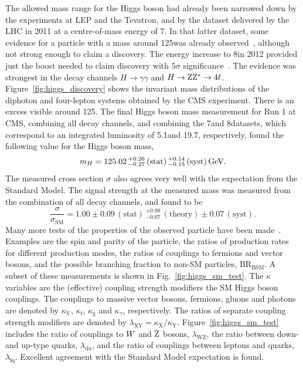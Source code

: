 The allowed mass range for the Higgs boson had already been narrowed down by the experiments at LEP
and the Tevatron, and by the dataset delivered by the LHC in 2011 at a centre-of-mass energy of
7\TeV. 
In that latter dataset, some evidence for a particle with a mass around 125\GeV was already
observed~\cite{Chatrchyan:2012tx}, although not strong enough to claim a discovery. 
The energy increase to 8\TeV in 2012 provided just the boost needed to claim
discovery with $5\sigma$ significance~\cite{Chatrchyan:2012ufa}. The evidence was strongest in the
decay channels $H\rightarrow\gamma\gamma$ and $H\rightarrow\mathrm{Z}\mathrm{Z}^*\rightarrow 4\ell$.
Figure~\ref{fig:higgs_discovery} shows the invariant mass distributions of the diphoton and
four-lepton systems obtained by the CMS experiment. There is an excess visible around 125\GeV. 
The final Higgs boson mass measurement for Run 1 at CMS, combining all decay channels, and combining
the 7\TeV and 8\TeV datasets, which correspond to an integrated luminosity of 5.1\fbinv and
19.7\fbinv, respectively, 
found the following value for the Higgs boson mass,
\begin{equation}
  m_H = 125.02 {\,}^{+0.26}_{-0.27} \, (\text{stat}) {\,}^{+0.14}_{-0.15} \, (\text{syst}) \,\text{Ge\hspace{-.08em}V}.
\end{equation}
The measured cross section $\sigma$ also agrees very well with the expectation from the Standard
Model. The signal strength at the measured mass was measured from the combination of all decay
channels, and found to be
\begin{equation}
 \frac{\sigma}{\sigma_{\text{SM}}} = 1.00 \pm 0.09 \, (\text{stat})
{\,}^{+0.08}_{-0.07} \, (\text{theory}) \pm 0.07 \, (\text{syst}) .
\end{equation}
Many more tests of the properties of the observed particle have been
made~\cite{Khachatryan:2014jba}. Examples are the spin and parity of the particle, the ratios of
production rates for different production modes, the ratios of couplings to fermions and vector
bosons, and the possible branching fraction to non-SM particles, $\text{BR}_{\text{BSM}}$. 
A subset of these measurements is shown in Fig.~\ref{fig:higgs_sm_test}. The $\kappa$ variables
are the (effective) coupling strength modifiers \wrt the SM Higgs boson couplings. The couplings to
massive vector bosons, fermions, gluons and photons are denoted by $\kappa_{\text{V}}$,
$\kappa_{\text{f}}$, $\kappa_{\text{g}}$ and $\kappa_\gamma$, respectively.
The ratios of separate coupling strength modifiers are denoted by $\lambda_{\text{XY}} =
\kappa_{\text{X}}/\kappa_{\text{Y}}$. Figure~\ref{fig:higgs_sm_test} includes the ratio of
couplings to $W$ and $\mathrm{Z}$ bosons, $\lambda_{\text{WZ}}$, the ratio between down- and up-type
quarks, $\lambda_{\text{du}}$, and the ratio of couplings between leptons and quarks,
$\lambda_{\text{lq}}$. 
Excellent agreement with the Standard Model expectation is found.

